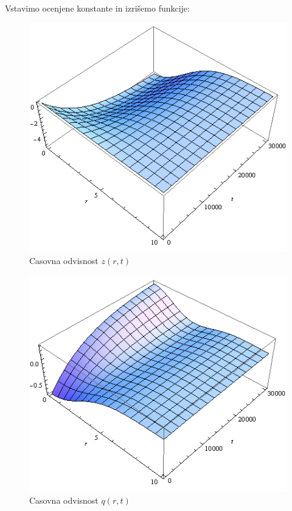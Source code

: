 \documentclass[a4paper, oneside, 12pt]{book}
\begin{document}
Vstavimo ocenjene konstante in izrišemo funkcije:
\begin{figure}[H]
  \begin{center}
    \includegraphics[width=14cm]{slike/vrtaca-ravnovesje-z}
  \end{center}
  \caption{Casovna odvisnost $z(r,t)$}
  \label{fig:difuzijski-casovna-odvisnost-z}
\end{figure}

\begin{figure}[H]
  \begin{center}
    \includegraphics[width=14cm]{slike/vrtaca-ravnovesje-q}
  \end{center}
  \caption{Casovna odvisnost $q(r,t)$}
  \label{fig:difuzijski-casovna-odvisnost-q}
\end{figure}
\end{document}
